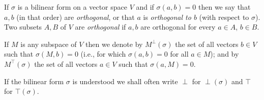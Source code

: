 If $\sigma$ is a bilinear form on a vector space $V$ and if $\sigma(a, b) = 0$ then we say that $a, b$ (in that order) are \emph{orthogonal}, or that $a$ is \emph{orthogonal to $b$} (with respect to $\sigma$). Two subsets $A, B$ of $V$ are \emph{orthogonal} if $a, b$ are orthogonal for every $a \in A$, $b \in B$.

If $M$ is any subspace of $V$ then we denote by $M^{\perp}(\sigma)$ the set of all vectors $b \in V$ such that $\sigma(M, b) = 0$ (i.e., for which $\sigma(a, b) = 0$ for all $a \in M$); and by $M^{\top}(\sigma)$ the set of all vectors $a \in V$ such that $\sigma(a, M) = 0$.

If the bilinear form $\sigma$ is understood we shall often write $\perp$ for $\perp(\sigma)$ and $\top$ for $\top(\sigma)$.
